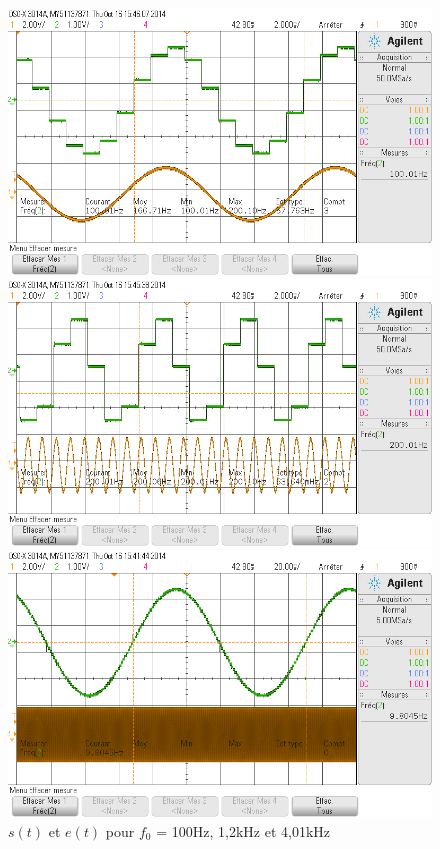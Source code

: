 \documentclass[../../Cours_M1.tex]{subfiles}
\begin{document}
\begin{figure}[h!]
\centering
\includegraphics[scale=0.35]{m1_f0100.png}

\includegraphics[scale=0.35]{m1_f01200.png}

\includegraphics[scale=0.35]{m1_f04010.png}
\caption{$s(t)$ et $e(t)$ pour $f_0$ = 100Hz, 1,2kHz et 4,01kHz}
\end{figure}
\end{document}
